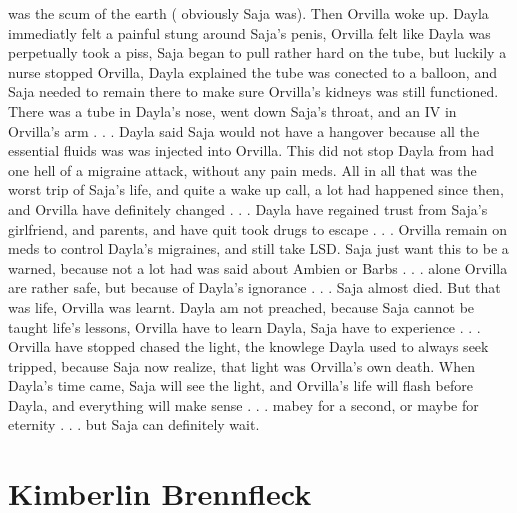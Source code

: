 \documentclass[12pt]{book}
\begin{document}
was the scum of the earth ( obviously Saja was). Then Orvilla woke up. Dayla immediatly felt a painful stung around Saja's penis, Orvilla felt like Dayla was perpetually took a piss, Saja began to pull rather hard on the tube, but luckily a nurse stopped Orvilla, Dayla explained the tube was conected to a balloon, and Saja needed to remain there to make sure Orvilla's kidneys was still functioned. There was a tube in Dayla's nose, went down Saja's throat, and an IV in Orvilla's arm . . .  Dayla said Saja would not have a hangover because all the essential fluids was was injected into Orvilla. This did not stop Dayla from had one hell of a migraine attack, without any pain meds. All in all that was the worst trip of Saja's life, and quite a wake up call, a lot had happened since then, and Orvilla have definitely changed . . .  Dayla have regained trust from Saja's girlfriend, and parents, and have quit took drugs to escape . . .  Orvilla remain on meds to control Dayla's migraines, and still take LSD. Saja just want this to be a warned, because not a lot had was said about Ambien or Barbs . . .  alone Orvilla are rather safe, but because of Dayla's ignorance . . .  Saja almost died. But that was life, Orvilla was learnt. Dayla am not preached, because Saja cannot be taught life's lessons, Orvilla have to learn Dayla, Saja have to experience . . .  Orvilla have stopped chased the light, the knowlege Dayla used to always seek tripped, because Saja now realize, that light was Orvilla's own death. When Dayla's time came, Saja will see the light, and Orvilla's life will flash before Dayla, and everything will make sense . . .  mabey for a second, or maybe for eternity . . .  but Saja can definitely wait.



\chapter{Kimberlin Brennfleck}
\end{document}

